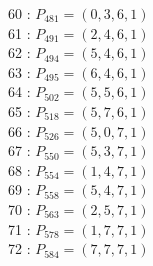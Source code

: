 \documentclass{article}
\begin{document}
{\begin{multicols}{3}
60 : $P_{481}=( 0, 3, 6, 1 )$\\
61 : $P_{491}=( 2, 4, 6, 1 )$\\
62 : $P_{494}=( 5, 4, 6, 1 )$\\
63 : $P_{495}=( 6, 4, 6, 1 )$\\
64 : $P_{502}=( 5, 5, 6, 1 )$\\
65 : $P_{518}=( 5, 7, 6, 1 )$\\
66 : $P_{526}=( 5, 0, 7, 1 )$\\
67 : $P_{550}=( 5, 3, 7, 1 )$\\
68 : $P_{554}=( 1, 4, 7, 1 )$\\
69 : $P_{558}=( 5, 4, 7, 1 )$\\
70 : $P_{563}=( 2, 5, 7, 1 )$\\
71 : $P_{578}=( 1, 7, 7, 1 )$\\
72 : $P_{584}=( 7, 7, 7, 1 )$\\
\end{multicols}


%


%


}%
\end{document}
